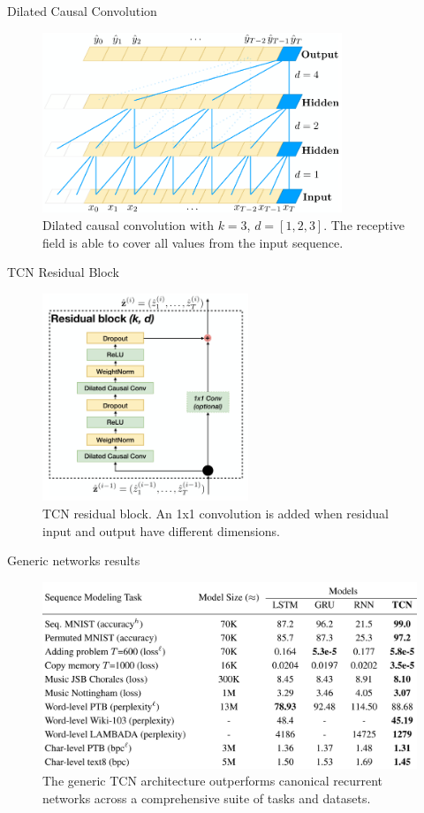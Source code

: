 \documentclass{beamer}
\begin{document}
\begin{frame}{Dilated Causal Convolution}
\begin{figure}[h]
\includegraphics[width=0.8\textwidth]{img/dilated}
\caption{Dilated causal convolution with $k=3$, $d=[1, 2, 3]$. The receptive field is able to cover all values from the input sequence.}
\end{figure}
\end{frame}
\begin{frame}{TCN Residual Block}
\begin{figure}[h]
\includegraphics[width=0.55\textwidth]{img/block}
\caption{TCN residual block. An 1x1 convolution is added when residual input and output have different dimensions.}
\end{figure}
\end{frame}
\begin{frame}{Generic networks results}
\begin{figure}[h]
\includegraphics[width=1.0\textwidth]{img/results}
\caption{The generic TCN architecture outperforms canonical recurrent networks across a
comprehensive suite of tasks and datasets.}
\end{figure}
\end{frame}
\end{document}
